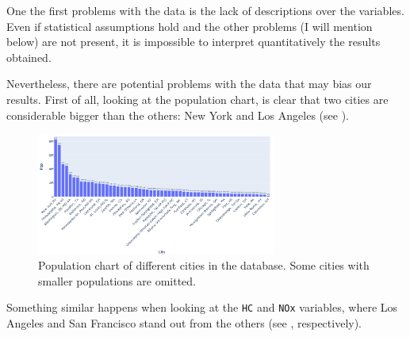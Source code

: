 \documentclass[11pt, english]{article}
\begin{document}
    One the first problems with the data is the lack of descriptions over
the variables. Even if statistical assumptions hold and the other
problems (I will mention below) are not present, it is impossible to
interpret quantitatively the results obtained.

Nevertheless, there are potential problems with the data that may bias
our results. First of all, looking at the population chart, is clear
that two cities are considerable bigger than the others: New York and
Los Angeles (see ). 

\begin{figure}[H]
	\centering
	\includegraphics[width=0.7\textwidth]{pop_chart}
	\caption{Population chart of different cities in the database. Some cities with smaller populations are omitted.}
	\label{fig:popchart}
\end{figure}


Something similar happens when looking at the \texttt{HC}
and \texttt{NOx} variables, where Los Angeles and San Francisco stand
out from the others (see , respectively).
\end{document}
